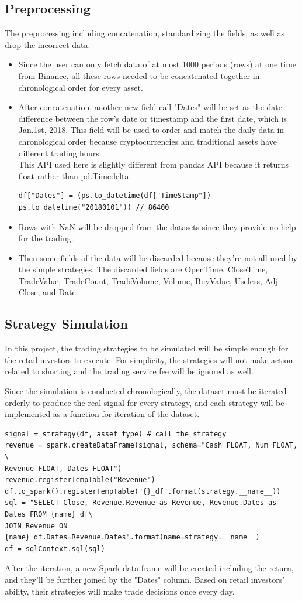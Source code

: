\documentclass[a4paper]{article}
\begin{document}
\subsection{Preprocessing}
The preprocessing including concatenation, standardizing the fields, as well as drop the incorrect data. 
\begin{itemize}
    \item Since the user can only fetch data of at most 1000 periods (rows) at one time from Binance, all these rows needed to be concatenated together in chronological order for every asset.
    \item After concatenation, another new field call "Dates" will be set as the date difference between the row's date or timestamp and the first date, which is Jan.1st, 2018. This field will be used to order and match the daily data in chronological order because cryptocurrencies and traditional assets have different trading hours. \\
    This API used here is slightly different from pandas API because it returns float rather than pd.Timedelta
    \begin{verbatim}
df["Dates"] = (ps.to_datetime(df["TimeStamp"]) - ps.to_datetime("20180101")) // 86400
    \end{verbatim}
    \item Rows with NaN will be dropped from the datasets since they provide no help for the trading.
    \item Then some fields of the data will be discarded because they're not all used by the simple strategies. The discarded fields are OpenTime, CloseTime, TradeValue, TradeCount, TradeVolume, Volume, BuyValue, Useless, Adj Close, and Date.  
\end{itemize}
\subsection{Strategy Simulation}
In this project, the trading strategies to be simulated will be simple enough for the retail investors to execute. For simplicity, the strategies will not make action related to shorting and the trading service fee will be ignored as well. 
\par Since the simulation is conducted chronologically, the dataset must be iterated orderly to produce the real signal for every strategy, and each strategy will be implemented as a function for iteration of the dataset.
\begin{verbatim}
signal = strategy(df, asset_type) # call the strategy
revenue = spark.createDataFrame(signal, schema="Cash FLOAT, Num FLOAT, \ 
Revenue FLOAT, Dates FLOAT")
revenue.registerTempTable("Revenue")
df.to_spark().registerTempTable("{}_df".format(strategy.__name__))
sql = "SELECT Close, Revenue.Revenue as Revenue, Revenue.Dates as Dates FROM {name}_df\
JOIN Revenue ON {name}_df.Dates=Revenue.Dates".format(name=strategy.__name__)
df = sqlContext.sql(sql)
\end{verbatim}
\par After the iteration, a new Spark data frame will be created including the return, and they'll be further joined by the "Dates" column. Based on retail investors' ability, their strategies will make trade decisions once every day.
\end{document}
